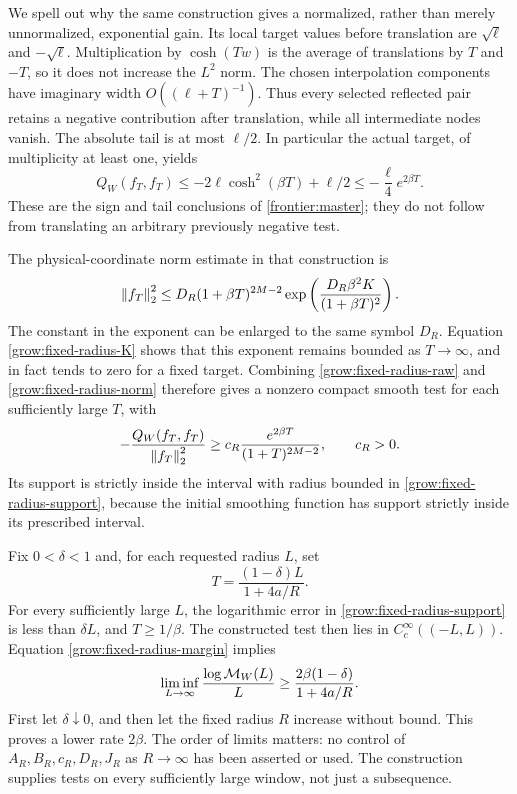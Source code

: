 We spell out why the same construction gives a normalized, rather
than merely unnormalized, exponential gain. Its local target values
before translation are \(\sqrt\ell\) and \(-\sqrt\ell\).
Multiplication by \(\cosh(Tw)\) is the average of translations by
\(T\) and \(-T\), so it does not increase the \(L^2\) norm.
The chosen interpolation components have imaginary width
\(O((\ell+T)^{-1})\). Thus every selected reflected pair retains
a negative contribution after translation, while all intermediate
nodes vanish. The absolute tail is at most \(\ell/2\). In
particular the actual target, of multiplicity at least one, yields
\begin{equation}\label{grow:fixed-radius-raw}
 Q_W(f_T,f_T)\le-2\ell\cosh^2(\beta T)+\ell/2
                 \le-\frac\ell4 e^{2\beta T}.
\end{equation}
These are the sign and tail conclusions of
\eqref{frontier:master}; they do not follow from translating an
arbitrary previously negative test.

The physical-coordinate norm estimate in that construction is
\begin{equation}\label{grow:fixed-radius-norm}
 \left\|f_T\right\|_2^2
 \le D_R(1+\beta T)^{2M-2}
             \exp\left(\frac{D_R\beta^2K}{(1+\beta T)^2}\right).
\end{equation}
The constant in the exponent can be enlarged to the same symbol
\(D_R\). Equation \eqref{grow:fixed-radius-K} shows that this
exponent remains bounded as \(T\to\infty\), and in fact tends
to zero for a fixed target. Combining
\eqref{grow:fixed-radius-raw} and \eqref{grow:fixed-radius-norm}
therefore gives a nonzero compact smooth test for each sufficiently
large \(T\), with
\begin{equation}\label{grow:fixed-radius-margin}
 -\frac{Q_W(f_T,f_T)}{\left\|f_T\right\|_2^2}
       \ge c_R\frac{e^{2\beta T}}{(1+T)^{2M-2}},
 \qquad c_R>0.
\end{equation}
Its support is strictly inside the interval with radius bounded in
\eqref{grow:fixed-radius-support}, because the initial smoothing
function has support strictly inside its prescribed interval.

Fix \(0<\delta<1\) and, for each requested radius \(L\), set
\[
 T=\frac{(1-\delta)L}{1+4a/R}.
\]
For every sufficiently large \(L\), the logarithmic error in
\eqref{grow:fixed-radius-support} is less than \(\delta L\),
and \(T\ge1/\beta\). The constructed test then lies in
\(C_c^\infty((-L,L))\). Equation
\eqref{grow:fixed-radius-margin} implies
\[
 \liminf_{L\to\infty}\frac{\log\mathcal M_W(L)}L
       \ge\frac{2\beta(1-\delta)}{1+4a/R}.
\]
First let \(\delta\downarrow0\), and then let the fixed radius
\(R\) increase without bound. This proves a lower rate
\(2\beta\). The order of limits matters: no control of
\(A_R,B_R,c_R,D_R,J_R\) as \(R\to\infty\) has been asserted
or used. The construction supplies tests on every sufficiently
large window, not just a subsequence.

